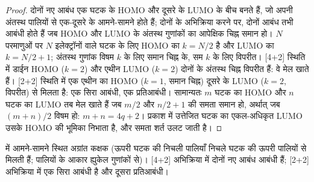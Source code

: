 \begin{proof}
दोनों नए आबंध एक घटक के HOMO और दूसरे के LUMO के बीच बनते हैं,
जो अपनी अंतस्थ पालियों से एक-दूसरे के आमने-सामने होते हैं; दोनों के
 अभिक्रिया करने पर, दोनों आबंध तभी आबंधी होते हैं जब
HOMO और LUMO के अंतस्थ गुणांकों का आपेक्षिक चिह्न समान हो। $N$ परमाणुओं पर $N$
इलेक्ट्रॉनों वाले घटक के लिए HOMO का $k = N/2$ है और LUMO का $k = N/2 + 1$; अंतस्थ गुणांक
विषम $k$ के लिए समान चिह्न के, सम $k$ के लिए विपरीत। [4+2] स्थिति में डाईन HOMO ($k = 2$)
और एथीन LUMO ($k = 2$) दोनों के अंतस्थ चिह्न विपरीत हैं: वे मेल खाते हैं।
[2+2] स्थिति में एक एथीन का HOMO ($k = 1$, समान चिह्न) दूसरे के LUMO
($k = 2$, विपरीत) से मिलता है: एक सिरा आबंधी, एक प्रतिआबंधी। सामान्यतः $m$
घटक का HOMO और $n$ घटक का LUMO तब मेल खाते हैं जब $m/2$ और $n/2 + 1$ की
समता समान हो, अर्थात् जब $(m + n)/2$ विषम हो: $m + n = 4q + 2$। प्रकाश में उत्तेजित घटक का
एकल-अधिकृत LUMO उसके HOMO की भूमिका निभाता है, और समता शर्त
उलट जाती है।
\end{proof}

\begin{omfigure}

{\small {}  में आमने-सामने स्थित अग्रांत कक्षक (ऊपरी घटक की
निचली पालियाँ निचले घटक की ऊपरी पालियों से मिलती हैं; पालियों के
आकार ह्युकेल गुणांकों से)। [4+2] अभिक्रिया में दोनों नए आबंध
आबंधी हैं; [2+2] अभिक्रिया में एक सिरा आबंधी है और दूसरा प्रतिआबंधी।}
\end{omfigure}

